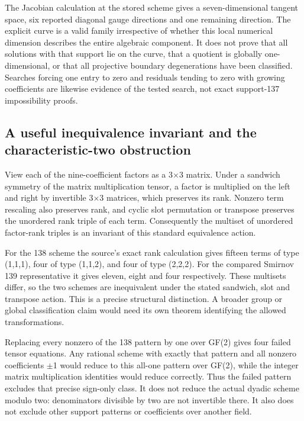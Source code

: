 \documentclass[11pt,a4paper]{article}
\begin{document}
The Jacobian calculation at the stored scheme gives a seven-dimensional tangent space, six reported diagonal gauge directions and one remaining direction. The explicit curve is a valid family irrespective of whether this local numerical dimension describes the entire algebraic component. It does not prove that all solutions with that support lie on the curve, that a quotient is globally one-dimensional, or that all projective boundary degenerations have been classified. Searches forcing one entry to zero and residuals tending to zero with growing coefficients are likewise evidence of the tested search, not exact support-137 impossibility proofs.

\subsection{A useful inequivalence invariant and the characteristic-two obstruction}
View each of the nine-coefficient factors as a 3\ensuremath{\times}3 matrix. Under a sandwich symmetry of the matrix multiplication tensor, a factor is multiplied on the left and right by invertible 3\ensuremath{\times}3 matrices, which preserves its rank. Nonzero term rescaling also preserves rank, and cyclic slot permutation or transpose preserves the unordered rank triple of each term. Consequently the multiset of unordered factor-rank triples is an invariant of this standard equivalence action.

For the 138 scheme the source's exact rank calculation gives fifteen terms of type (1,1,1), four of type (1,1,2), and four of type (2,2,2). For the compared Smirnov 139 representative it gives eleven, eight and four respectively. These multisets differ, so the two schemes are inequivalent under the stated sandwich, slot and transpose action. This is a precise structural distinction. A broader group or global classification claim would need its own theorem identifying the allowed transformations.

Replacing every nonzero of the 138 pattern by one over GF(2) gives four failed tensor equations. Any rational scheme with exactly that pattern and all nonzero coefficients \ensuremath{\pm}1 would reduce to this all-one pattern over GF(2), while the integer matrix multiplication identities would reduce correctly. Thus the failed pattern excludes that precise sign-only class. It does not reduce the actual dyadic scheme modulo two: denominators divisible by two are not invertible there. It also does not exclude other support patterns or coefficients over another field.
\end{document}
